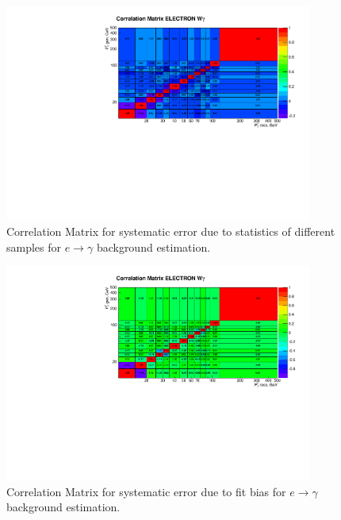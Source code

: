 \begin{figure}[htb]
  \begin{center}
\includegraphics[width=0.90\textwidth]{../figs/figs_v11/ELECTRON_WGamma/Constants/matrCorrelation_syst_etog_stat.pdf}
  \caption{Correlation Matrix for systematic error due to statistics of different samples for $e\rightarrow\gamma$ background estimation.}
  \label{fig:corrMatrices_syst_etog_stat_Wg}
  \end{center}
\end{figure}

\begin{figure}[htb]
  \begin{center}
\includegraphics[width=0.90\textwidth]{../figs/figs_v11/ELECTRON_WGamma/Constants/matrCorrelation_syst_etog_diff.pdf}
  \caption{Correlation Matrix for systematic error due to fit bias for $e\rightarrow\gamma$ background estimation.}
  \label{fig:corrMatrices_syst_etog_diff_Wg}
  \end{center}
\end{figure}

